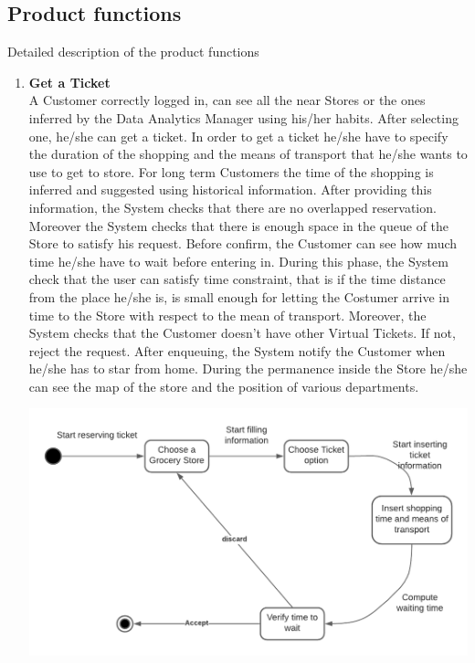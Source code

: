 \documentclass[a4paper, 12pt, oneside]{article}
\begin{document}
\subsection{Product functions}
Detailed description of the product functions

\begin{enumerate}
    \item \textbf{Get a Ticket} 
    \\
    A Customer correctly logged in, can see all the near Stores or the ones inferred by the Data Analytics Manager using his/her habits. After selecting one, he/she can get a ticket. In order to get a ticket he/she have to specify the duration of the shopping and the means of transport that he/she wants to use to get to store. For long term Customers the time of the shopping is inferred and suggested using historical information.
        After providing this information, the System checks that there are no overlapped reservation. Moreover the System checks that there is enough space in the queue of the Store to satisfy his request.
        Before confirm, the Customer can see how much time he/she have to wait before entering in. During this phase, the System check that the user can satisfy time constraint, that is if the time distance from the place he/she is, is small enough for letting the Costumer arrive in time to the Store with respect to the mean of transport. Moreover, the System checks that the Customer doesn't have other Virtual Tickets. If not, reject the request.
        After enqueuing, the System notify the Customer when he/she has to star from home.
        During the permanence inside the Store he/she can see the map of the store and the position of various departments.
     \\
       	\begin{minipage}{\linewidth}
            \centering
           \includegraphics[height=0.3\textheight, scale=0.2, keepaspectratio]{img/Get_Ticket_diagram.png}
        \end{minipage}
    

\end{enumerate}
\end{document}
